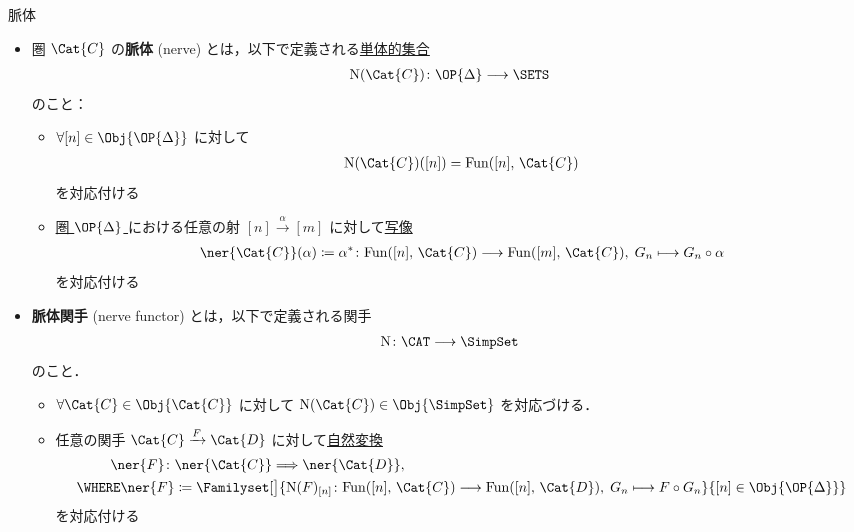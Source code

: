 \documentclass[TQFT_main]{subfiles}
\begin{document}
\begin{mydef}[label=def:nerve]{脈体}
    \begin{itemize}
        \item 圏 $\Cat{C}$ の\textbf{脈体} (nerve) とは，以下で定義される\hyperref[def:SimpSet]{単体的集合}
        \begin{align}
            \mathrm{N}(\Cat{C}) \colon \OP{\Delta} \lto \SETS
        \end{align}
        のこと：
        \begin{itemize}
            \item $\forall [n] \in \Obj{\OP{\Delta}}$ に対して
            \begin{align}
                \mathrm{N}(\Cat{C}) ([n]) = \mathrm{Fun} ([n],\, \Cat{C})
            \end{align}
            を対応付ける
            \item \hyperref[def:simplex-cat]{圏 $\OP{\Delta}$ }における任意の射 $[n] \xrightarrow{\alpha} [m]$ に対して\underline{写像}
            \begin{align}
                \ner{\Cat{C}}(\alpha) \coloneqq \alpha^* \colon \mathrm{Fun}([n],\, \Cat{C}) \lto \mathrm{Fun}([m],\, \Cat{C}),\; G_n \lmto G_n \circ \alpha
            \end{align}
            を対応付ける
        \end{itemize}

        \item \textbf{脈体関手} (nerve functor) とは，以下で定義される関手
        \begin{align}
            \mathrm{N} \colon \CAT \lto \SimpSet
        \end{align}
        のこと．
        \begin{itemize}
            \item $\forall \Cat{C} \in \Obj{\Cat{C}}$ に対して $\mathrm{N}(\Cat{C}) \in \Obj{\SimpSet}$ を対応づける．
            \item 任意の関手 $\Cat{C} \xrightarrow{F} \Cat{D}$ に対して\hyperref[def:nat]{自然変換}
            \begin{align}
                \ner{F} \colon &\ner{\Cat{C}} \Longrightarrow \ner{\Cat{D}}, \\
                \WHERE \ner{F} &\coloneqq \Familyset[\big]{\mathrm{N}(F)_{[n]} \colon \mathrm{Fun}([n],\, \Cat{C}) \lto \mathrm{Fun}([n],\, \Cat{D}),\; G_n \lmto F \circ G_n}{[n] \in \Obj{\OP{\Delta}}}
            \end{align}
            を対応付ける
        \end{itemize}
    \end{itemize}
    
\end{mydef}
\end{document}

